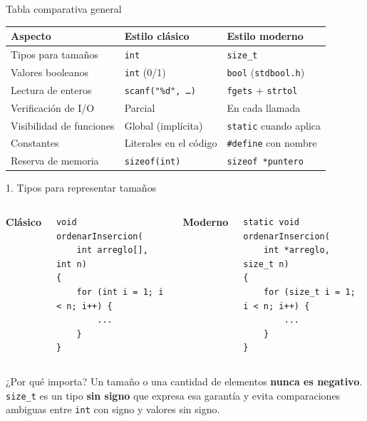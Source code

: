 \documentclass[aspectratio=169]{beamer}
\begin{document}
\begin{frame}{Tabla comparativa general}
    \small
    \begin{table}
        \begin{tabular}{p{3.3cm}p{4.2cm}p{4.2cm}}
            \toprule
            \textbf{Aspecto} & \textbf{Estilo clásico} & \textbf{Estilo moderno} \\
            \midrule
            Tipos para tamaños & \texttt{int} & \texttt{size\_t} \\
            Valores booleanos & \texttt{int} (0/1) & \texttt{bool} (\texttt{stdbool.h}) \\
            Lectura de enteros & \texttt{scanf("\%d", \ldots)} & \texttt{fgets} + \texttt{strtol} \\
            Verificación de I/O & Parcial & En cada llamada \\
            Visibilidad de funciones & Global (implícita) & \texttt{static} cuando aplica \\
            Constantes & Literales en el código & \texttt{\#define} con nombre \\
            Reserva de memoria & \texttt{sizeof(int)} & \texttt{sizeof *puntero} \\
            \bottomrule
        \end{tabular}
    \end{table}
\end{frame}

\begin{frame}[fragile]{1. Tipos para representar tamaños}
    \begin{columns}[T]
        \textbf{Clásico}
        \begin{lstlisting}
void ordenarInsercion(
    int arreglo[], int n)
{
    for (int i = 1; i < n; i++) {
        ...
    }
}
        \end{lstlisting}

        \textbf{Moderno}
        \begin{lstlisting}
static void ordenarInsercion(
    int *arreglo, size_t n)
{
    for (size_t i = 1; i < n; i++) {
        ...
    }
}
        \end{lstlisting}
    \end{columns}

    \vspace{0.5em}
    \begin{alertblock}{¿Por qué importa?}
        Un tamaño o una cantidad de elementos \textbf{nunca es negativo}.
        \texttt{size\_t} es un tipo \textbf{sin signo} que expresa esa garantía
        y evita comparaciones ambiguas entre \texttt{int} con signo y valores sin signo.
    \end{alertblock}
\end{frame}
\end{document}
